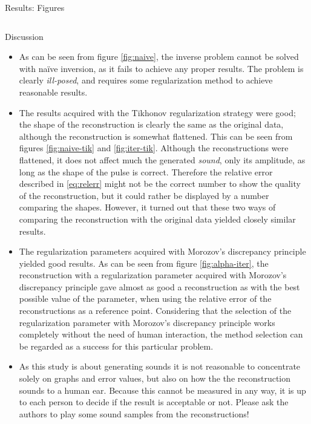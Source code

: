\documentclass[final]{beamer}
\begin{document}
\begin{frame}[t]
\begin{columns}[t]
\begin{column}{.465\textwidth}
\begin{block}{Results: Figures}
\begin{columns}
\end{columns}


\end{block}


\begin{block}{Discussion}

\begin{itemize}

\item As can be seen from figure \ref{fig:naive}, the inverse problem cannot be solved with naïve inversion, as it fails to achieve any proper results. The problem is clearly \emph{ill-posed}, and requires some regularization method to achieve reasonable results.

\item The results acquired with the Tikhonov regularization strategy were good; the shape of the reconstruction is clearly the same as the original data, although the reconstruction is somewhat flattened. This can be seen from figures \ref{fig:naive-tik} and \ref{fig:iter-tik}. Although the reconstructions were flattened, it does not affect much the generated \emph{sound}, only its amplitude, as long as the shape of the pulse is correct. Therefore the relative error described in \eqref{eq:relerr} might not be the correct number to show the quality of the reconstruction, but it could rather be displayed by a number comparing the shapes. However, it turned out that these two ways of comparing the reconstruction with the original data yielded closely similar results.

\item The regularization parameters acquired with Morozov's discrepancy principle yielded good results. As can be seen from figure \ref{fig:alpha-iter}, the reconstruction with a regularization parameter acquired with Morozov's discrepancy principle gave almost as good a reconstruction as with the best possible value of the parameter, when using the relative error of the reconstructions as a reference point. Considering that the selection of the regularization parameter with Morozov's discrepancy principle works completely without the need of human interaction, the method selection can be regarded as a success for this particular problem.

\item As this study is about generating sounds it is not reasonable to concentrate solely on graphs and error values, but also on how the the reconstruction sounds to a human ear. Because this cannot be measured in any way, it is up to each person to decide if the result is acceptable or not. Please ask the authors to play some sound samples from the reconstructions!


\end{itemize}
\end{block}
\end{column}
\end{columns}
\end{frame}
\end{document}
